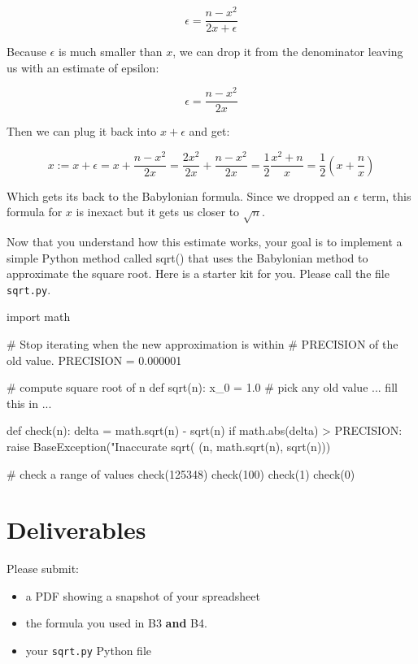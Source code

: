 \begin{fullwidth}
\[
\epsilon = \frac{n - x^2}{2x + \epsilon}
\]

Because $\epsilon$ is much smaller than $x$, we can drop it from the denominator leaving us with an estimate of epsilon:

\[
\epsilon = \frac{n - x^2}{2x}
\]

Then we can plug it back into $x + \epsilon$ and get:

\[
x := x + \epsilon = x + \frac{n - x^2}{2x} = \frac{2x^2}{2x} + \frac{n - x^2}{2x} = \frac{1}{2}\frac{x^2 + n}{x} = \frac{1}{2}(x + \frac{n}{x})
\]

Which gets its back to the Babylonian formula. Since we dropped an $\epsilon$ term, this formula for $x$ is inexact but it gets us closer to $\sqrt{n}$.


Now that you understand how this estimate works, your goal is to implement a simple Python method called sqrt() that uses the Babylonian method to approximate the square root. Here is a starter kit for you. Please call the file {\tt sqrt.py}.

\begin{pyverbatim}
import math

# Stop iterating when the new approximation is within
# PRECISION of the old value.
PRECISION = 0.000001

# compute square root of n
def sqrt(n):
    x_0 = 1.0 # pick any old value
    ... fill this in ...

def check(n):
    delta = math.sqrt(n) - sqrt(n)
    if math.abs(delta) > PRECISION:
        raise BaseException("Inaccurate sqrt(%
            (n, math.sqrt(n), sqrt(n)))

# check a range of values
check(125348)
check(100)
check(1)
check(0)
\end{pyverbatim}

\section{Deliverables}

Please submit:

\begin{itemize}
\item a PDF showing a snapshot of your spreadsheet
\item the formula you used in B3 {\bf and} B4.
\item your {\tt sqrt.py} Python file
\end{itemize}

\end{fullwidth}

